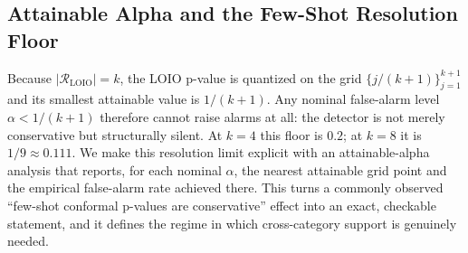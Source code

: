 \subsection{Attainable Alpha and the Few-Shot Resolution Floor}
Because $|\mathcal{R}_{\mathrm{LOIO}}|=k$, the LOIO p-value is quantized on the grid $\{j/(k{+}1)\}_{j=1}^{k+1}$ and its smallest attainable value is $1/(k{+}1)$. Any nominal false-alarm level $\alpha<1/(k{+}1)$ therefore cannot raise alarms at all: the detector is not merely conservative but structurally silent. At $k{=}4$ this floor is $0.2$; at $k{=}8$ it is $1/9\approx0.111$. We make this resolution limit explicit with an attainable-alpha analysis that reports, for each nominal $\alpha$, the nearest attainable grid point and the empirical false-alarm rate achieved there. This turns a commonly observed ``few-shot conformal p-values are conservative'' effect into an exact, checkable statement, and it defines the regime in which cross-category support is genuinely needed.

